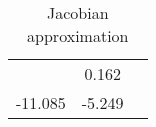 
    \begin{table}\caption{Jacobian approximation}
\centering
    \begin{tabular}{|l|c|c|}
    \toprule
    \miderule1 & 0.162\\
-11.085 & -5.249\\

      \bottomrule
      \end{tabular}
      \end{table}